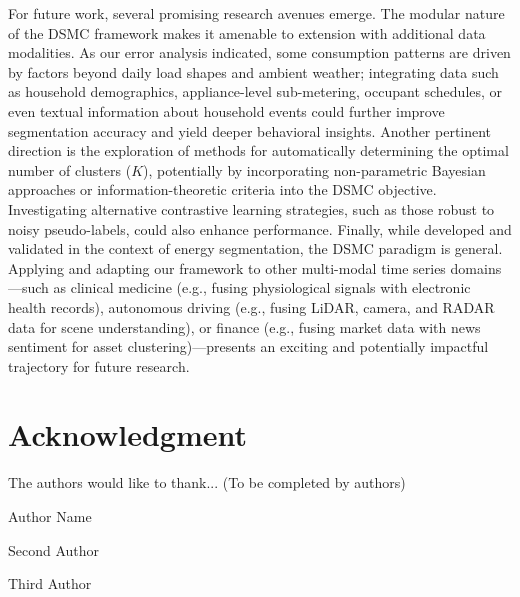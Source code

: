 \documentclass[journal]{IEEEtran}
\begin{document}
For future work, several promising research avenues emerge. The modular nature of the DSMC framework makes it amenable to extension with additional data modalities. As our error analysis indicated, some consumption patterns are driven by factors beyond daily load shapes and ambient weather; integrating data such as household demographics, appliance-level sub-metering, occupant schedules, or even textual information about household events could further improve segmentation accuracy and yield deeper behavioral insights. Another pertinent direction is the exploration of methods for automatically determining the optimal number of clusters ($K$), potentially by incorporating non-parametric Bayesian approaches or information-theoretic criteria into the DSMC objective. Investigating alternative contrastive learning strategies, such as those robust to noisy pseudo-labels, could also enhance performance. Finally, while developed and validated in the context of energy segmentation, the DSMC paradigm is general. Applying and adapting our framework to other multi-modal time series domains—such as clinical medicine (e.g., fusing physiological signals with electronic health records), autonomous driving (e.g., fusing LiDAR, camera, and RADAR data for scene understanding), or finance (e.g., fusing market data with news sentiment for asset clustering)—presents an exciting and potentially impactful trajectory for future research.


\section*{Acknowledgment}
The authors would like to thank... (To be completed by authors)


 


\begin{IEEEbiography}{Author Name}
\end{IEEEbiography}

\begin{IEEEbiography}{Second Author}
\end{IEEEbiography}

\begin{IEEEbiography}{Third Author}
\end{IEEEbiography}
\end{document}
